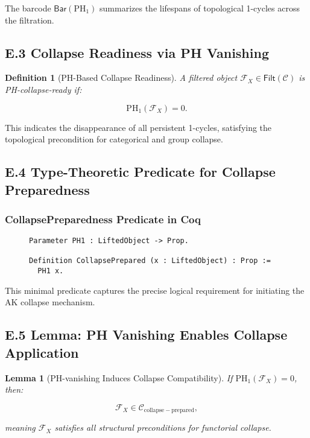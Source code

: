 \documentclass[11pt]{article}
\newtheorem{definition}[theorem]{Definition}
\newtheorem{lemma}[theorem]{Lemma}
\begin{document}
The barcode \( \mathsf{Bar}(\mathrm{PH}_1) \) summarizes the lifespans of topological 1-cycles across the filtration.

\subsection*{E.3 Collapse Readiness via PH Vanishing}

\begin{definition}[PH-Based Collapse Readiness]
A filtered object \( \mathcal{F}_X \in \mathsf{Filt}(\mathcal{C}) \) is \emph{PH-collapse-ready} if:

\[
\mathrm{PH}_1(\mathcal{F}_X) = 0.
\]
\end{definition}

This indicates the disappearance of all persistent 1-cycles, satisfying the topological precondition for categorical and group collapse.

\subsection*{E.4 Type-Theoretic Predicate for Collapse Preparedness}

\subsubsection*{CollapsePreparedness Predicate in Coq}

\begin{figure}[h]
\centering
\begin{lstlisting}[language=Coq, caption=Persistent Homology Based Collapse Preparedness]
Parameter PH1 : LiftedObject -> Prop.

Definition CollapsePrepared (x : LiftedObject) : Prop :=
  PH1 x.
\end{lstlisting}
\end{figure}

This minimal predicate captures the precise logical requirement for initiating the AK collapse mechanism.

\subsection*{E.5 Lemma: PH Vanishing Enables Collapse Application}

\begin{lemma}[PH-vanishing Induces Collapse Compatibility]
If \( \mathrm{PH}_1(\mathcal{F}_X) = 0 \), then:

\[
\mathcal{F}_X \in \mathcal{C}_{\mathrm{collapse-prepared}},
\]

meaning \( \mathcal{F}_X \) satisfies all structural preconditions for functorial collapse.
\end{lemma}
\end{document}
